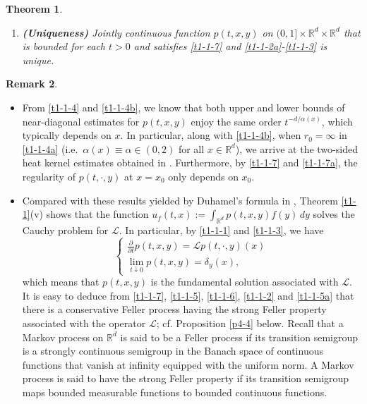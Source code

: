 \documentclass[a4paper,11pt]{amsart}
\newcommand{\R}{\mathds R}
\newcommand{\A}{\alpha}
\def\LL{{\mathcal L}}
\newtheorem{theorem}{Theorem}[section]
\theoremstyle{definition}
\newtheorem{remark}[theorem]{Remark}
\begin{document}
\begin{theorem}
\begin{enumerate}
For every $f \in C_{b,u}^2(\R^d):= C_{b,u}(\R^d)\cap C^2(\R^d)$,  we also have
\begin{equation}\label{t1-1-5a}
\frac{\partial u_f(t,x)}{\partial t}=\int_{\R^d}
p(t,x,y)\LL f(y)\,dy,\quad  t\in
(0,1],\ x \in \R^d
\end{equation} and
\begin{equation}\label{t1-1-5b}
\lim_{t \downarrow 0}\sup_{x \in \R^d}\Big|\frac{1}{t}\cdot\big(
u_f(t,x)-f(x)\big)-\LL f(x)\Big|=0.
\end{equation}

\item[(vi)] {\bf (Uniqueness)} Jointly continuous function $p(t, x, y)$ on $(0, 1]\times \R^d\times \R^d$
that is bounded for each $t>0$ and  satisfies
\eqref{t1-1-7} and \eqref{t1-1-2a}-\eqref{t1-1-3} is unique.
\end{enumerate}
\end{theorem}

\begin{remark}\label{remark1}
\begin{itemize}
\item [(1)] From \eqref{t1-1-4} and \eqref{t1-1-4b}, we know that both upper and lower bounds of
near-diagonal
estimates for $p(t,x,y)$ enjoy the same order $t^{-{d/\A(x)}}$, which typically depends on $x$.
In particular, along with \eqref{t1-1-4b}, when $r_0=\infty$ in \eqref{t1-1-4a} (i.e.\ $\A(x)\equiv \A \in (0,2)$ for all $x\in \R^d$), we arrive at the two-sided heat kernel estimates obtained in
\cite{CZ}.
Furthermore, by \eqref{t1-1-7} and \eqref{t1-1-7a}, the regularity of $p(t,\cdot,y)$ at $x=x_0$ only depends on
$x_0$.

\item [(2)] Compared with these results yielded by  Duhamel's formula in \cite{Kol},  Theorem \ref{t1-1}(v) shows that the function $u_f(t,x):=\int_{\R^d}p(t,x,y)f(y)\,dy$ solves  the Cauchy problem for  $\LL$. In particular, by \eqref{t1-1-1} and \eqref{t1-1-3}, we have
\begin{equation*}
\begin{cases}
\frac{\partial }{\partial t} p(t,x,y) = \LL p(t,\cdot,y)(x)\\
\lim_{t \downarrow 0} p(t,x,y)=\delta_y(x),
\end{cases}
\end{equation*}
which means that $p(t,x,y)$ is the fundamental solution associated
with $\LL$. It is easy to deduce from \eqref{t1-1-7},  \eqref{t1-1-5}, \eqref{t1-1-6},
\eqref{t1-1-2} and \eqref{t1-1-5a} that there is  a conservative Feller process  having the strong Feller property
associated with the operator $\LL$;  cf.  Proposition \ref{p4-4} below.
Recall that a Markov process on $\R^d$ is said to be a Feller process if its transition semigroup is a strongly continuous semigroup in the Banach space of continuous functions that vanish at infinity equipped
with the uniform norm.
A Markov process is said to have the strong Feller property if its transition semigroup maps bounded
measurable functions to bounded continuous functions.
\end{itemize}
\end{remark}
\end{document}
